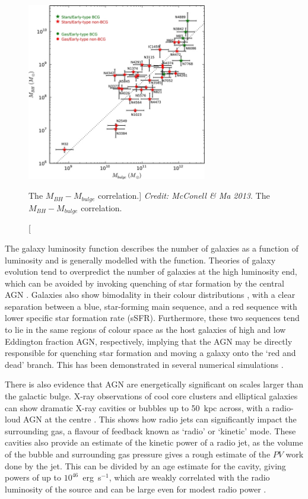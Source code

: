 \begin{figure}
\centering
\includegraphics[width=0.7\textwidth]{figures/02-outflows/mbulge.jpg}
\caption
[The $M_{BH}-M_{bulge}$ correlation.]
{
{\sl Credit: McConell \& Ma 2013}. 
The $M_{BH}-M_{bulge}$ correlation.
} 
\label{fig:mbulge}
\end{figure}

The galaxy luminosity function describes
the number of galaxies as a function of luminosity and is generally modelled
with the \cite{schechter1976} function. Theories of 
galaxy evolution tend to overpredict the number of galaxies at the
high luminosity end, which can be avoided by invoking quenching
of star formation by the central AGN \citep[e.g.][]{read2005,bongiorno2016}.
Galaxies also show bimodality in their colour distributions 
\citep{strateva2001,bell2003a,baldry2004}, 
with a clear separation between a blue, star-forming
main sequence, and a red sequence with lower 
specific star formation rate (sSFR). Furthermore, these two 
sequences tend to lie in the same regions of colour space as the 
host galaxies of high and low 
Eddington fraction AGN, respectively, implying that the AGN may be 
directly responsible for quenching star formation and moving 
a galaxy onto the `red and dead' branch. This has been demonstrated in 
several numerical simulations \citep[e.g.][]{springel2005,croton2006}.

There is also evidence that AGN are energetically 
significant on scales larger than the galactic bulge. X-ray observations
of cool core clusters and elliptical galaxies
can show dramatic X-ray cavities or bubbles
up to 50~kpc across, with a radio-loud AGN at the centre
\citep[Fig.~\ref{fig:xray_bubbles}]{randall2011,cavagnolo2011,fabian2012}. This
shows how radio jets can significantly impact the surrounding gas,
a flavour of feedback known as `radio' or `kinetic' mode.
These cavities also provide an estimate of the kinetic power of a radio
jet, as the volume of the bubble and surrounding gas pressure gives a 
rough estimate of the $PV$ work done by the jet. This can be divided by
an age estimate for the cavity, giving powers
of up to $10^{46}$~erg~s$^{-1}$, which are weakly 
correlated with the radio luminosity of the source 
and can be large even for modest radio power \citep{birzan2008}. 

